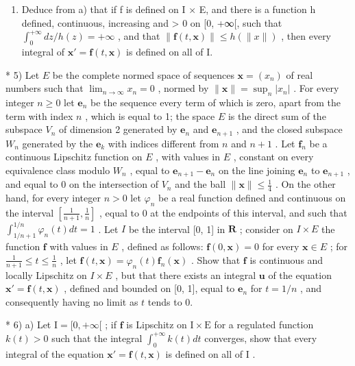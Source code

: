 \begin{enumerate}
\def\labelenumi{\alph{enumi})}
\setcounter{enumi}{1}
\tightlist
\item
  Deduce from a) that if f is defined on I × E, and there is a function h defined, continuous, increasing and \textgreater{} 0 on {[}0, +∞{[}, such that \(\int_{0}^{+\infty} dz / h(z) = +\infty\) , and that \(\|\mathbf{f}(t, \mathbf{x})\| \leqslant h(\|x\|)\) , then every integral of \(\mathbf{x}' = \mathbf{f}(t, \mathbf{x})\) is defined on all of I.
\end{enumerate}

* 5) Let \(E\) be the complete normed space of sequences \(\mathbf{x} = (x_{n})\) of real numbers such that \(\lim_{n\to \infty}x_n = 0\) , normed by \(\| \mathbf{x}\| = \sup_n|x_n|\) . For every integer \(n\geqslant 0\) let \(\mathbf{e}_n\) be the sequence every term of which is zero, apart from the term with index \(n\) , which is equal to 1; the space \(E\) is the direct sum of the subspace \(V_{n}\) of dimension 2 generated by \(\mathbf{e}_n\) and \(\mathbf{e}_{n + 1}\) , and the closed subspace \(W_{n}\) generated by the \(\mathbf{e}_k\) with indices different from \(n\) and \(n + 1\) . Let \(\mathbf{f}_n\) be a continuous Lipschitz function on \(E\) , with values in \(E\) , constant on every equivalence class modulo \(W_{n}\) , equal to \(\mathbf{e}_{n + 1} - \mathbf{e}_n\) on the line joining \(\mathbf{e}_n\) to \(\mathbf{e}_{n + 1}\) , and equal to 0 on the intersection of \(V_{n}\) and the ball \(\| \mathbf{x}\| \leqslant \frac{1}{4}\) . On the other hand, for every integer \(n > 0\) let \(\varphi_{n}\) be a real function defined and continuous on the interval \(\left[\frac{1}{n + 1},\frac{1}{n}\right]\) , equal to 0 at the endpoints of this interval, and such that \(\int_{1 / n + 1}^{1 / n}\varphi_n(t)dt = 1\) . Let \(I\) be the interval {[}0, 1{]} in \(\mathbf{R}\) ; consider on \(I\times E\) the function \(\mathbf{f}\) with values in \(E\) , defined as follows: \(\mathbf{f}(0,\mathbf{x}) = 0\) for every \(\mathbf{x}\in E\) ; for \(\frac{1}{n + 1}\leqslant t\leqslant \frac{1}{n}\) , let \(\mathbf{f}(t,\mathbf{x}) = \varphi_n(t)\mathbf{f}_n(\mathbf{x})\) . Show that \(\mathbf{f}\) is continuous and locally Lipschitz on \(I\times E\) , but that there exists an integral \(\mathbf{u}\) of the equation \(\mathbf{x}' = \mathbf{f}(t,\mathbf{x})\) , defined and bounded on {[}0, 1{]}, equal to \(\mathbf{e}_n\) for \(t = 1 / n\) , and consequently having no limit as \(t\) tends to 0.

* 6) a) Let \(\mathrm{I} = [0, +\infty[\) ; if \(\mathbf{f}\) is Lipschitz on \(\mathrm{I} \times \mathrm{E}\) for a regulated function \(k(t) > 0\) such that the integral \(\int_0^{+\infty} k(t) dt\) converges, show that every integral of the equation \(\mathbf{x}' = \mathbf{f}(t, \mathbf{x})\) is defined on all of \(\mathrm{I}\) .

